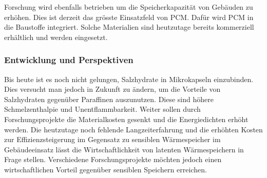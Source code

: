 \documentclass[11pt,a4paper]{scrartcl}
\begin{document}
Forschung wird ebenfalls betrieben um die Speicherkapazität von Gebäuden zu
erhöhen. Dies ist derzeit das grösste Einsatzfeld von PCM. Dafür wird  PCM in
die Baustoffe integriert. Solche Materialien sind heutzutage bereits kommerziell
erhältlich und werden eingesetzt.


\subsubsection{Entwicklung und Perspektiven}
Bis heute ist es noch nicht gelungen, Salzhydrate in Mikrokapseln einzubinden.
Dies versucht man jedoch in Zukunft zu ändern, um die Vorteile von Salzhydraten
gegenüber Paraffinen auszunutzen. Diese sind höhere Schmelzenthalpie und
Unentflammbarkeit. Weiter sollen durch Forschungsprojekte die Materialkosten
gesenkt und die Energiedichten erhöht werden. Die heutzutage noch fehlende
Langzeiterfahrung und die erhöhten Kosten zur Effizienzsteigerung im Gegensatz
zu sensiblen Wärmespeicher im Gebäudeeinsatz lässt die Wirtschaftlichkeit von
latenten Wärmespeichern in Frage stellen. Verschiedene Forschungsprojekte
möchten jedoch einen wirtschaftlichen Vorteil gegenüber sensiblen Speichern
erreichen.
\end{document}

